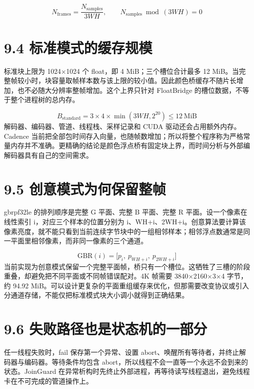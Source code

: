 \documentclass[UTF8,zihao=-4,openany]{ctexbook}
\begin{document}
\begin{equation}
N_{\mathrm{frames}}=\frac{N_{\mathrm{samples}}}{3WH},\qquad N_{\mathrm{samples}}\bmod(3WH)=0
\end{equation}

\section*{9.4 标准模式的缓存规模}
标准块上限为 1024×1024 个 float，即 4 MiB；三个槽位合计最多 12 MiB。当完整帧较小时，块容量取帧样本数与该上限的较小值。因此颜色桥缓存不随片长增加，也不必随大分辨率整帧增加。这个上界只针对 FloatBridge 的槽位数据，不等于整个进程树的总内存。


\begin{equation}
B_{\mathrm{standard}}=3\times4\times\min(3WH,2^{20})\leq12\ \mathrm{MiB}
\end{equation}
解码器、编码器、管道、线程栈、采样记录和 CUDA 驱动还会占用额外内存。Cadence 当前把全部包时间存入向量，也随帧数增加；所以将整个程序称为严格常量内存并不准确。更精确的结论是颜色浮点桥有固定块上界，而时间分析与外部编解码器具有自己的空间需求。


\section*{9.5 创意模式为何保留整帧}
gbrpf32le 的排列顺序是完整 G 平面、完整 B 平面、完整 R 平面。设一个像素在线性索引 i，对应三个样本的位置分别为 i、WH+i、2WH+i。创意算法要计算该像素亮度，就不能只看到当前连续字节块中的一组相邻样本；相邻浮点数通常是同一平面里相邻像素，而非同一像素的三个通道。


\begin{equation}
\mathrm{GBR}(i)=\bigl[p_i,\ p_{WH+i},\ p_{2WH+i}\bigr]
\end{equation}
当前实现为创意模式保留一个完整平面帧，桥只有一个槽位。这牺牲了三槽的阶段重叠，却避免把不同平面或不同帧错误配对。4K 帧需要 3840×2160×3×4 字节，约 94.92 MiB。可以设计更复杂的平面重组缓存来优化，但那需要改变协议或引入分通道存储，不能仅把标准模式块大小调小就得到正确结果。


\section*{9.6 失败路径也是状态机的一部分}
任一线程失败时，fail 保存第一个异常、设置 abort、唤醒所有等待者，并终止解码器与编码器。等待条件均包含 abort，所以线程不会一直等一个永远不会到来的状态。JoinGuard 在异常析构时先终止外部进程，再等待读写线程退出，避免线程卡在不可完成的管道操作上。
\end{document}
